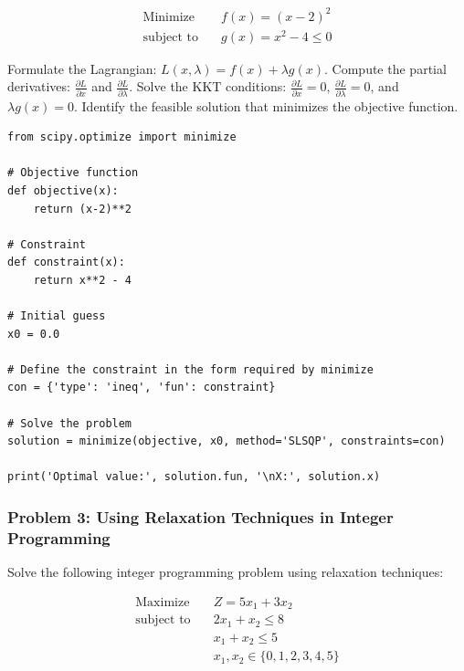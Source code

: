 \documentclass[12pt]{book} %
\begin{document}
\begin{align*}
\text{Minimize} \quad & f(x) = (x-2)^2 \\
\text{subject to} \quad & g(x) = x^2 - 4 \leq 0
\end{align*}


\begin{algorithm}
\caption{Lagrange Relaxation}
\begin{algorithmic}[1]
\State Formulate the Lagrangian: $L(x, \lambda) = f(x) + \lambda g(x)$.
\State Compute the partial derivatives: $\frac{\partial L}{\partial x}$ and $\frac{\partial L}{\partial \lambda}$.
\State Solve the KKT conditions: $\frac{\partial L}{\partial x} = 0$, $\frac{\partial L}{\partial \lambda} = 0$, and $\lambda g(x) = 0$.
\State Identify the feasible solution that minimizes the objective function.
\end{algorithmic}
\end{algorithm}

\FloatBarrier

\begin{lstlisting}
from scipy.optimize import minimize

# Objective function
def objective(x):
    return (x-2)**2

# Constraint
def constraint(x):
    return x**2 - 4

# Initial guess
x0 = 0.0

# Define the constraint in the form required by minimize
con = {'type': 'ineq', 'fun': constraint}

# Solve the problem
solution = minimize(objective, x0, method='SLSQP', constraints=con)

print('Optimal value:', solution.fun, '\nX:', solution.x)
\end{lstlisting}

\FloatBarrier

\subsubsection*{Problem 3: Using Relaxation Techniques in Integer Programming}
Solve the following integer programming problem using relaxation techniques:

\begin{align*}
\text{Maximize} \quad & Z = 5x_1 + 3x_2 \\
\text{subject to} \quad & 2x_1 + x_2 \leq 8 \\
& x_1 + x_2 \leq 5 \\
& x_1, x_2 \in \{0, 1, 2, 3, 4, 5\}
\end{align*}
\end{document}
